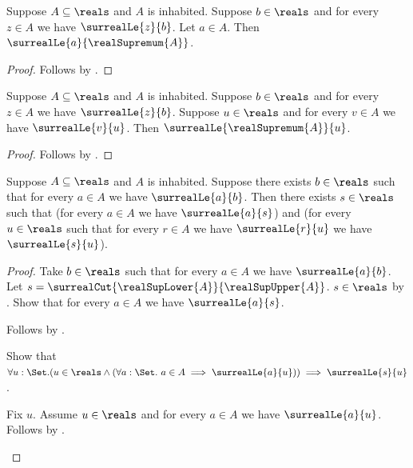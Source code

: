 \begin{corollary}\label{real_supremum_upper_bound}
    Suppose $A\subseteq\reals$ and $A$ is inhabited.
    Suppose $b\in\reals$ and for every $z\in A$ we have
        $\surrealLe{z}{b}$.
    Let $a\in A$.
    Then $\surrealLe{a}{\realSupremum{A}}$.
\end{corollary}
\begin{proof}
    Follows by
        .
\end{proof}

\begin{corollary}\label{real_supremum_least}
    Suppose $A\subseteq\reals$ and $A$ is inhabited.
    Suppose $b\in\reals$ and for every $z\in A$ we have
        $\surrealLe{z}{b}$.
    Suppose $u\in\reals$ and for every $v\in A$ we have
        $\surrealLe{v}{u}$.
    Then $\surrealLe{\realSupremum{A}}{u}$.
\end{corollary}
\begin{proof}
    Follows by
        .
\end{proof}

\begin{theorem}\label{surreal_reals_least_upper_bound}
    Suppose $A\subseteq\reals$ and $A$ is inhabited.
    Suppose there exists $b\in\reals$ such that for every $a\in A$
        we have $\surrealLe{a}{b}$.
    Then there exists $s\in\reals$ such that
        (for every $a\in A$ we have $\surrealLe{a}{s}$) and
        (for every $u\in\reals$ such that for every $r\in A$ we have
            $\surrealLe{r}{u}$ we have $\surrealLe{s}{u}$).
\end{theorem}
\begin{proof}
    Take $b\in\reals$ such that for every $a\in A$ we have
        $\surrealLe{a}{b}$.
    Let $s=\surrealCut{\realSupLower{A}}{\realSupUpper{A}}$.
    $s\in\reals$ by .
    Show that for every $a\in A$ we have $\surrealLe{a}{s}$.
    \begin{subproof}
        Follows by .
    \end{subproof}
    Show that $\forall u:\Set.
        (u\in\reals\land
         (\forall a:\Set.\ a\in A\implies\surrealLe{a}{u}))
        \implies\surrealLe{s}{u}$.
    \begin{subproof}
        Fix $u$.
        Assume $u\in\reals$ and
            for every $a\in A$ we have $\surrealLe{a}{u}$.
        Follows by .
    \end{subproof}
\end{proof}

